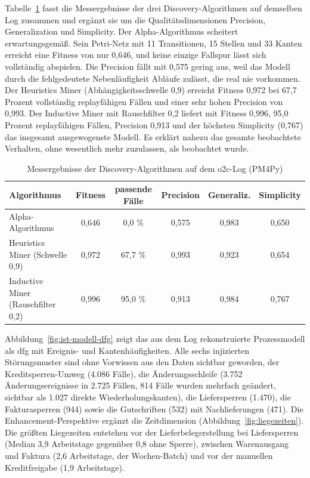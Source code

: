 Tabelle~\ref{tab:messergebnisse-discovery} fasst die Messergebnisse der drei Discovery-Algorithmen auf demselben Log zusammen und ergänzt sie um die Qualitätsdimensionen Precision, Generalization und Simplicity. Der Alpha-Algorithmus scheitert erwartungsgemäß. Sein Petri-Netz mit 11 Transitionen, 15 Stellen und 33 Kanten erreicht eine Fitness von nur 0,646, und keine einzige Fallspur lässt sich vollständig abspielen. Die Precision fällt mit 0,575 gering aus, weil das Modell durch die fehlgedeutete Nebenläufigkeit Abläufe zulässt, die real nie vorkommen. Der Heuristics Miner (Abhängigkeitsschwelle 0,9) erreicht Fitness 0,972 bei 67,7 Prozent vollständig replayfähigen Fällen und einer sehr hohen Precision von 0,993. Der Inductive Miner mit Rauschfilter 0,2 liefert mit Fitness 0,996, 95,0 Prozent replayfähigen Fällen, Precision 0,913 und der höchsten Simplicity (0,767) das insgesamt ausgewogenste Modell. Es erklärt nahezu das gesamte beobachtete Verhalten, ohne wesentlich mehr zuzulassen, als beobachtet wurde.

\begin{table}[!htb]
\centering
\caption{Messergebnisse der Discovery-Algorithmen auf dem \gls{o2c}-Log (PM4Py)}\label{tab:messergebnisse-discovery}
\small
\begin{tabular}{@{}>{\RaggedRight\arraybackslash}p{4.3cm} c c c c c@{}}
\toprule
\textbf{Algorithmus} & \textbf{Fitness} & \textbf{passende Fälle} & \textbf{Precision} & \textbf{Generaliz.} & \textbf{Simplicity} \\
\midrule
Alpha-Algorithmus & 0,646 & 0,0 \% & 0,575 & 0,983 & 0,650 \\
Heuristics Miner (Schwelle 0,9) & 0,972 & 67,7 \% & 0,993 & 0,923 & 0,654 \\
Inductive Miner (Rauschfilter 0,2) & 0,996 & 95,0 \% & 0,913 & 0,984 & 0,767 \\
\bottomrule
\end{tabular}
\end{table}

Abbildung~\ref{fig:ist-modell-dfg} zeigt das aus dem Log rekonstruierte Prozessmodell als \gls{dfg} mit Ereignis- und Kantenhäufigkeiten. Alle sechs injizierten Störungsmuster sind ohne Vorwissen aus den Daten sichtbar geworden, der Kreditsperren-Umweg (4.086 Fälle), die Änderungsschleife (3.752 Änderungsereignisse in 2.725 Fällen, 814 Fälle wurden mehrfach geändert, sichtbar als 1.027 direkte Wiederholungskanten), die Liefersperren (1.470), die Fakturasperren (944) sowie die Gutschriften (532) mit Nachlieferungen (471). Die Enhancement-Perspektive ergänzt die Zeitdimension (Abbildung~\ref{fig:liegezeiten}). Die größten Liegezeiten entstehen vor der Lieferbelegerstellung bei Liefersperren (Median 3,9 Arbeitstage gegenüber 0,8 ohne Sperre), zwischen Warenausgang und Faktura (2,6 Arbeitstage, der Wochen-Batch) und vor der manuellen Kreditfreigabe (1,9 Arbeitstage).

